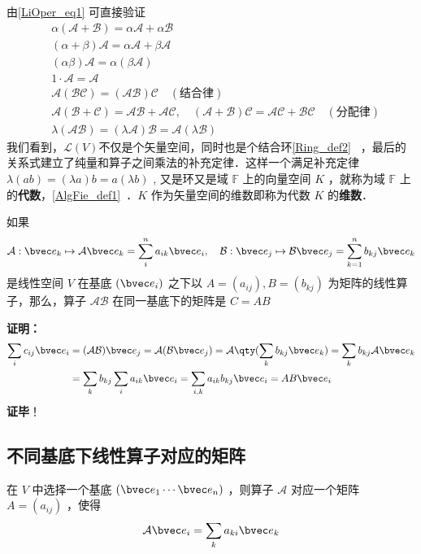 由\autoref{LiOper_eq1} 可直接验证
\begin{equation}
\begin{aligned}
&\alpha(\mathcal{A+B})=\alpha\mathcal{A}+\alpha\mathcal{B}\\
&(\alpha+\beta)\mathcal{A}=\alpha\mathcal{A}+\beta\mathcal{A}\\
&(\alpha\beta)\mathcal{A}=\alpha(\beta\mathcal{A})\\
&1\cdot \mathcal{A}=\mathcal A\\
&\mathcal{A}(\mathcal{BC})=(\mathcal{AB})\mathcal C\quad(\text{结合律})\\
&\mathcal A(\mathcal{B+C})=\mathcal{AB+AC},\quad (\mathcal{A+B})\mathcal C=\mathcal{AC+BC}\quad(\text{分配律})\\
&\lambda(\mathcal{AB})=(\lambda\mathcal{A})\mathcal{B}=\mathcal{A}(\lambda \mathcal B)
\end{aligned}
\end{equation}
我们看到，$\mathcal{L}(V)$不仅是个矢量空间，同时也是个结合环\autoref{Ring_def2}~ ，最后的关系式建立了纯量和算子之间乘法的补充定律．这样一个满足补充定律 $\lambda(ab)=(\lambda a)b=a(\lambda b)$ , 又是环又是域 $\mathbb{F}$ 上的向量空间 $K$ ，就称为域 $\mathbb{F}$ 上的\textbf{代数}，\autoref{AlgFie_def1}~．$K$ 作为矢量空间的维数即称为代数 $K$ 的\textbf{维数}．

\begin{theorem}{}\label{LiOper_the1}
如果
\begin{equation}
\mathcal{A}:\bvec e_k\mapsto \mathcal{A}\bvec e_k=\sum_i^{n}a_{ik}\bvec e_i,\quad \mathcal{B}:\bvec e_j\mapsto  \mathcal{B}\bvec e_j=\sum_{k=1}^n b_{kj}\bvec e_k
\end{equation}
是线性空间 $V$ 在基底 $(\bvec e_i)$ 之下以 $A=(a_{ij}), B=(b_{kj})$ 为矩阵的线性算子，那么，算子 $\mathcal{AB}$ 在同一基底下的矩阵是 $C=AB$
\end{theorem}
\textbf{证明：}
\begin{equation}
\begin{aligned}
\sum_i c_{ij}\bvec e_i&=(\mathcal{AB})\bvec e_j=\mathcal{A}(\mathcal{B}\bvec e_j)=\mathcal{A}\qty(\sum_k b_{kj}\bvec e_k)=\sum_k b_{kj}\mathcal{A}\bvec e_k\\
&=\sum_k b_{kj}\sum_i a_{ik}\bvec e_i=\sum_{i,k}a_{ik}b_{kj}\bvec e_i=AB\bvec e_i
\end{aligned}
\end{equation}
\textbf{证毕}！
\subsection{不同基底下线性算子对应的矩阵}
在 $V$ 中选择一个基底 $(\bvec e_1\cdots \bvec e_n)$ ，则算子 $\mathcal{A}$ 对应一个矩阵 $A=(a_{ij})$ ，使得
\begin{equation}
\mathcal{A}\bvec e_i=\sum_{k} a_{ki}\bvec e_k
\end{equation}

